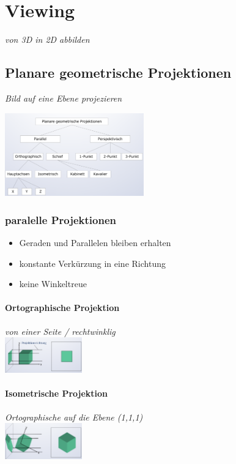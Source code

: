 \section{Viewing}
\textit{von 3D in 2D abbilden}

\subsection{Planare geometrische Projektionen}
\textit{Bild auf eine Ebene projezieren}

\includegraphics[width=0.45\textwidth]{assets/KlassifikationvonProjektionen.png}

\subsubsection{paralelle Projektionen}

\begin{itemize}
    \item Geraden und Parallelen bleiben erhalten
    \item konstante Verkürzung in eine Richtung
    \item keine Winkeltreue
\end{itemize}

\paragraph{Ortographische Projektion}
\textit{von einer Seite / rechtwinklig}\\
\includegraphics[width=0.25\textwidth]{assets/OrtographischeProjektion.png}

\paragraph{Isometrische Projektion}
\textit{Ortographische auf die Ebene (1,1,1)}\\
\includegraphics[width=0.25\textwidth]{assets/IsometrischeProjektion.png}

